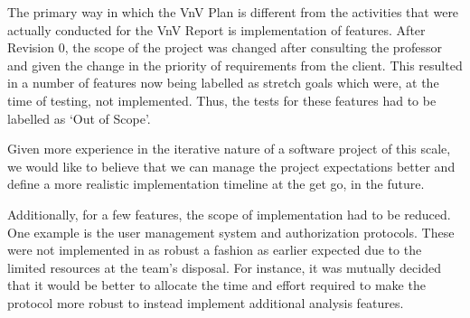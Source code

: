 \documentclass[12pt, titlepage]{article}
\begin{document}
\begin{enumerate}
  The primary way in which the VnV Plan is different from the activities that
  were actually conducted for the VnV Report is implementation of features.
  After Revision 0, the scope of the project was changed after consulting the
  professor and given the change in the priority of requirements from the
  client. This resulted in a number of features now being labelled as stretch
  goals which were, at the time of testing, not implemented. Thus, the tests for
  these features had to be labelled as `Out of Scope'.

  Given more experience in the iterative nature of a software project of this
  scale, we would like to believe that we can manage the project expectations
  better and define a more realistic implementation timeline at the get go, in
  the future.

  Additionally, for a few features, the scope of implementation had to be
  reduced. One example is the user management system and authorization
  protocols. These were not implemented in as robust a fashion as earlier
  expected due to the limited resources at the team's disposal. For instance, it
  was mutually decided that it would be better to allocate the time and effort
  required to make the protocol more robust to instead implement additional
  analysis features.
\end{enumerate}
\end{document}

